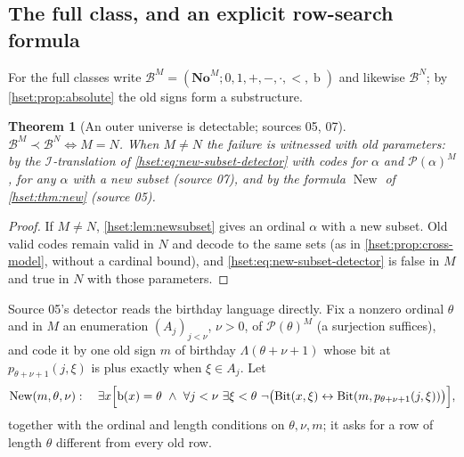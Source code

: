 \documentclass[11pt,letterpaper]{article}
\newtheorem{theorem}{Theorem}[section]
\theoremstyle{definition}
\theoremstyle{remark}
\newcommand{\No}{\mathbf{No}}
\newcommand{\bd}{\operatorname{b}}
\newcommand{\B}{\mathcal B}
\newcommand{\I}{\mathcal I}
\newcommand{\Bit}{\operatorname{Bit}}
\newcommand{\New}{\operatorname{New}}
\newcommand{\Pow}{\mathcal P}
\newcommand{\lbl}[1]{\nolinkurl{#1}}
\newcommand{\repo}[1]{\nolinkurl{#1}}
\newcommand{\Oz}{\mathbf{Oz}}
\begin{document}
\subsection{The full class, and an explicit row-search formula}

For the full classes write $\B^M=(\No^M;0,1,+,-,\cdot,<,\bd)$ and likewise
$\B^N$; by \cref{hset:prop:absolute} the old signs form a substructure.

\begin{theorem}[An outer universe is detectable; sources 05, 07]
\label{hset:thm:outer}
$\B^M\prec\B^N\iff M=N$. When $M\ne N$ the failure is witnessed with old
parameters: by the $\I$-translation of \eqref{hset:eq:new-subset-detector} with
codes for $\alpha$ and $\Pow(\alpha)^M$, for any $\alpha$ with a new subset
(source 07), and by the formula $\New$ of \cref{hset:thm:new} (source 05).
\end{theorem}
\begin{proof}
If $M\ne N$, \cref{hset:lem:newsubset} gives an ordinal $\alpha$ with a new
subset. Old valid codes remain valid in $N$ and decode to the same sets (as in
\cref{hset:prop:cross-model}, without a cardinal bound), and
\eqref{hset:eq:new-subset-detector} is false in $M$ and true in $N$ with those
parameters.
\end{proof}

\noindent[Added 4 October 2026, batch~93: Part~III of
\repo{definable-surreals-and-omnific-integers} (its source~06; AI-assisted,
unrefereed, not formalized) proves a parameter-free quotient interpretation of
$(V,\in)$ in $(\No;+,\cdot,<,\Oz,\Omega)$, a signature without birthday order (its
Theorem~37.1, \lbl{dsn:op:thm:V-interpretation}), and the transfer
$M\equiv N\iff\mathfrak S_\Omega^M\equiv\mathfrak S_\Omega^N$ together with, for
nested $M\subseteq W$, $M\preccurlyeq W\iff\mathfrak S_\Omega^M\preccurlyeq
\mathfrak S_\Omega^W$ (its Theorem~40.4, \lbl{dsn:op:thm:theory-faithful}); a dated
note there uses the argument of this theorem to show that for models of the same
height both sides hold only when $M=W$. No bi-interpretation is claimed for that
signature (its Question~42.1, \lbl{dsn:op:q:biinterpretation}). Added 4 October
2026, batch~95: Part~IX reduces the specific form of that question to the
definability of birthday precedence in that signature
(\cref{hset:sf:rem:dsn,hset:sf:prop:reducts}).]

Source 05's detector reads the birthday language directly. Fix a nonzero
ordinal $\theta$ and in $M$ an enumeration $(A_j)_{j<\nu}$, $\nu>0$, of
$\Pow(\theta)^M$ (a surjection suffices), and code it by one old sign $m$ of
birthday $\Lambda(\theta+\nu+1)$ whose bit at $p_{\theta+\nu+1}(j,\xi)$ is plus
exactly when $\xi\in A_j$. Let
\[
 \New(m,\theta,\nu):\quad
 \exists x\Bigl[\bd(x)=\theta\ \land\
 \forall j<\nu\ \exists\xi<\theta\
 \neg\bigl(\Bit(x,\xi)\leftrightarrow
 \Bit(m,p_{\theta+\nu+1}(j,\xi))\bigr)\Bigr],
\]
together with the ordinal and length conditions on $\theta,\nu,m$; it asks for a
row of length $\theta$ different from every old row.
\end{document}

